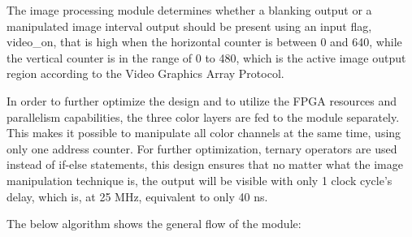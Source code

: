\par The image processing module determines whether a blanking output or a manipulated image interval output should be present using an input flag, video\_on, that is high when the horizontal counter is between 0 and 640, while the vertical counter is in the range of 0 to 480, which is the active image output region according to the Video Graphics Array Protocol. \newline
\par In order to further optimize the design and to utilize the FPGA resources and parallelism capabilities, the three color layers are fed to the module separately. This makes it possible to manipulate all color channels at the same time, using only one address counter. For further optimization, ternary operators are used instead of if-else statements, this design ensures that no matter what the image manipulation technique is, the output will be visible with only 1 clock cycle's delay, which is, at 25 MHz, equivalent to only 40 ns. \newline
\par The below algorithm shows the general flow of the module: \newline

